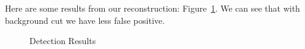 \documentclass[a4paper]{article}
\begin{document}
\begin{enumerate}
Here are some results from our reconstruction: Figure~\ref{fig:detector}. We can see that with background cut we have less false positive.
\begin{figure}[htb]
    \begin{center}
    \end{center}
    \caption{Detection Results}
    \label{fig:detector}
\end{figure}


\end{enumerate}
\end{document}
